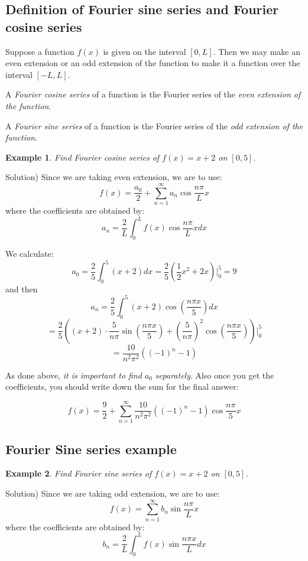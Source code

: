 \documentclass[12pt]{report}
\newtheorem{ex}{Example}[section]
\begin{document}
\subsection*{Definition of Fourier sine series and Fourier cosine series}

Suppose a function $f(x)$ is given on the interval $[0,L]$. Then we may make an even extension or an odd extension of the function to make it a function over the interval $[-L,L]$.

A \textit{Fourier cosine series} of a function is the Fourier series of the \textit{even extension of the function}.

A \textit{Fourier sine series} of a function is the Fourier series of the \textit{odd extension of the function}.

\begin{ex} Find Fourier cosine series of $f(x) = x+2$ on $[0,5]$.
	\end{ex}
Solution)
Since we are taking even extension, we are to use:
$$f(x) = \frac{a_0}{2} + \sum_{n=1}^{\infty}  a_n \cos \frac{n\pi}{L} x  $$
where the coefficients are obtained by:
$$a_n = \frac{2}{L} \int_{0}^{L} f(x) \cos \frac{n\pi}{L} x dx$$

We calculate:
$$a_0 = \frac{2}{5} \int_0^5 (x+2) dx = \frac{2}{5} \left(\frac{1}{2} x^2 + 2x \right) \Bigg\vert_0^5 = 9$$
and then
$$a_n = \frac{2}{5} \int_0^5 (x+2) \cos \left(\frac{n\pi x}{5} \right) dx $$
$$ = \frac{2}{5} \left((x+2)\cdot \frac{5}{n\pi} \sin \left(\frac{n\pi x}{5} \right) + \left(\frac{5}{n\pi} \right)^2 \cos \left(\frac{n\pi x}{5} \right) \right) \Bigg\vert_0^5$$
$$ = \frac{10}{n^2\pi^2} \left( (-1)^n -1 \right)$$

As done above, \textit{it is important to find } $a_0$ \textit{separately}. Also once you get the coefficients, you should write down the sum for the final answer:

$$f(x) = \frac{9}{2} + \sum_{n=1}^{\infty}  \frac{10}{n^2\pi^2} \left( (-1)^n -1 \right) \cos \frac{n\pi}{5} x  $$



\subsection*{Fourier Sine series example }
\begin{ex} Find Fourier sine series of $f(x) = x+2$ on $[0,5]$.
	\end{ex}
Solution)
Since we are taking odd extension, we are to use:
$$f(x) = \sum_{n=1}^{\infty}  b_n \sin \frac{n\pi}{L} x  $$
where the coefficients are obtained by:
$$b_n = \frac{2}{L} \int_{0}^{L} f(x) \sin \frac{n\pi x}{L}  dx$$
\end{document}
